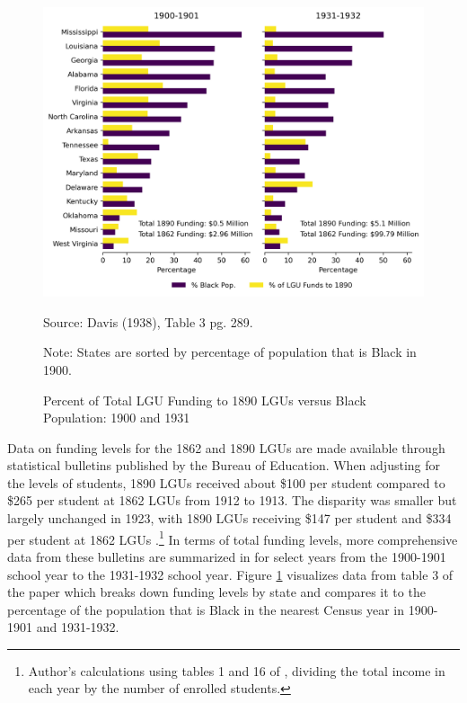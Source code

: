 \documentclass[12pt]{article}
\begin{document}
\begin{figure}
\caption{Percent of Total LGU Funding to 1890 LGUs versus Black Population: 1900 and 1931}
\label{1890LGUfunds}
\centering
    \includegraphics[width=.9\textwidth]{figs/Figure2.png}

Source: Davis (1938), Table 3 pg. 289. 

Note: States are sorted by percentage of population that is Black in 1900.
\end{figure}

Data on funding levels for the 1862 and 1890 LGUs are made available through statistical bulletins published by the Bureau of Education.
When adjusting for the levels of students, 1890 LGUs received about \$100 per student compared to \$265 per student at 1862 LGUs from 1912 to 1913.
The disparity was smaller but largely unchanged in 1923, with 1890 LGUs receiving \$147 per student and \$334 per student at 1862 LGUs \citep{greenleaf_statistics_1926}.\footnote{Author's calculations using tables 1 and 16 of \citet{greenleaf_statistics_1926}, dividing the total income in each year by the number of enrolled students.}
In terms of total funding levels, more comprehensive data from these bulletins are summarized in \citet{davis_participation_1938} for select years from the 1900-1901 school year to the 1931-1932 school year.
Figure \ref{1890LGUfunds} visualizes data from table 3 of the paper which breaks down funding levels by state and compares it to the percentage of the population that is Black in the nearest Census year in 1900-1901 and 1931-1932.
\end{document}
